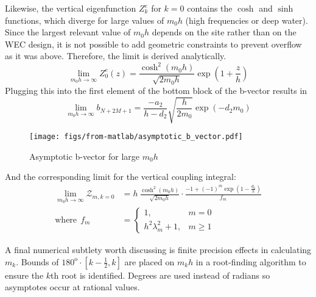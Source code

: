 \begin{appendices}
Likewise, the vertical eigenfunction $Z_k^e$ for $k=0$ contains the $\cosh$ and $\sinh$ functions, which diverge for large values of $m_0h$ (high frequencies or deep water).
Since the largest relevant value of $m_0h$ depends on the site rather than on the WEC design, it is not possible to add geometric constraints to prevent overflow as it was above.
Therefore, the limit is derived analytically. %
\begin{equation}
    \lim_{m_0h\rightarrow\infty} Z_0^e(z)= \frac{\cosh^2(m_0h)}{\sqrt{2m_0h}}\exp\left(1+\frac{z}{h}\right)
\end{equation}
Plugging this into the first element of the bottom block of the b-vector results in 
\begin{equation}
    \lim_{m_0h\rightarrow\infty}b_{N+2M+1}=\frac{-a_2}{h-d_2} \sqrt{\frac{h}{2m_0}}\exp(-d_2m_0)
\end{equation}
\begin{figure}
    \centering
    \texttt{[image: figs/from-matlab/asymptotic\_b\_vector.pdf]}
    \caption{Asymptotic b-vector for large $m_0h$}
    \label{fig:meem-b-limit}
\end{figure}


And the corresponding limit for the vertical coupling integral:
\begin{equation}
\begin{aligned}
    \lim_{m_0h\rightarrow\infty}\boldsymbol{\mathcal{Z}}_{m,k=0} &
    = h~\frac{\cosh^2(m_0h)}{\sqrt{2m_0h}}\cdot \frac{-1+(-1)^m\exp(1-\frac{d_2}{h})}{f_{m}} \\
    \text{where}~~f_m&= \begin{cases}
        1, & m=0 \\
        h^2\lambda_m^2+1, & m \geq 1
    \end{cases}
    \end{aligned}
\end{equation}

A final numerical subtlety worth discussing is finite precision effects in calculating $m_k$.
Bounds of $180^\textrm{o}\cdot[k-\frac{1}{2}, k]$ are placed on $m_kh$ in a root-finding algorithm to ensure the $k$th root is identified.
Degrees are used instead of radians so asymptotes occur at rational values.


\end{appendices}
